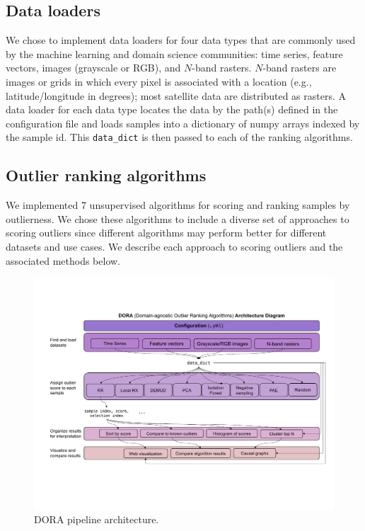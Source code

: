\documentclass[utf8]{frontiersFPHY} %
\begin{document}
\subsection{Data loaders} 
We chose to implement data loaders for four
data types that are commonly used by the machine learning and domain science
communities: time series, feature vectors, images (grayscale or RGB), and 
$N$-band rasters. $N$-band rasters are images or grids in which every pixel
is associated with a location (e.g., latitude/longitude in degrees); 
most satellite data are distributed as rasters.
A data loader for each data type locates the data by the path(s)
defined in the configuration file and loads samples into a dictionary of numpy
arrays indexed by the sample id. This \texttt{data\_dict} is then passed to 
each of the ranking algorithms.

\subsection{Outlier ranking algorithms} 
We implemented 7 unsupervised 
algorithms for scoring and 
ranking samples by outlierness. 
We chose these algorithms to include a diverse
set of approaches to scoring outliers since different algorithms may  
perform better for different datasets and use cases. 
We describe each
approach to scoring outliers and the associated methods below.

\begin{figure}
\centering
\includegraphics[width=\linewidth]{figures/dora-system-diagram-v5.pdf}
\caption{DORA pipeline architecture.}
\label{fig:dora}
\end{figure}
\end{document}
